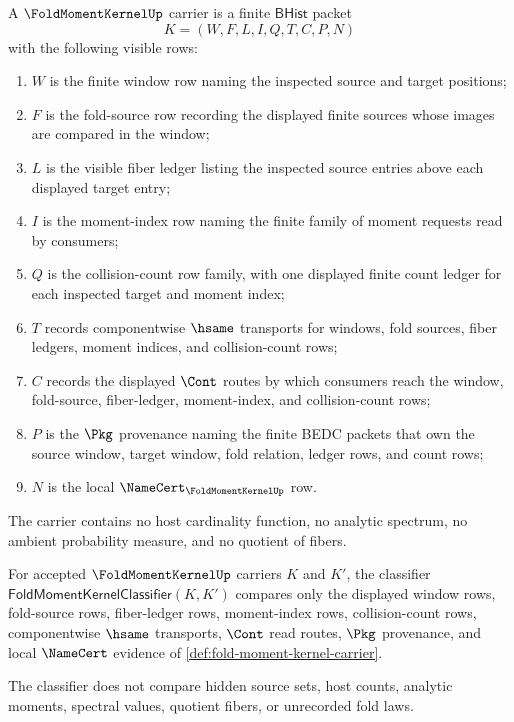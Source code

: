\begin{definition}
\label{def:fold-moment-kernel-carrier}
A $\FoldMomentKernelUp$ carrier is a finite $\mathsf{BHist}$ packet
$$
K=(W,F,L,I,Q,T,C,P,N)
$$
with the following visible rows:
\begin{enumerate}
\item $W$ is the finite window row naming the inspected source and target
positions;
\item $F$ is the fold-source row recording the displayed finite sources whose
images are compared in the window;
\item $L$ is the visible fiber ledger listing the inspected source entries
above each displayed target entry;
\item $I$ is the moment-index row naming the finite family of moment requests
read by consumers;
\item $Q$ is the collision-count row family, with one displayed finite count
ledger for each inspected target and moment index;
\item $T$ records componentwise $\hsame$ transports for windows, fold sources,
fiber ledgers, moment indices, and collision-count rows;
\item $C$ records the displayed $\Cont$ routes by which consumers reach the
window, fold-source, fiber-ledger, moment-index, and collision-count rows;
\item $P$ is the $\Pkg$ provenance naming the finite BEDC packets that own the
source window, target window, fold relation, ledger rows, and count rows;
\item $N$ is the local $\NameCert_{\FoldMomentKernelUp}$ row.
\end{enumerate}
The carrier contains no host cardinality function, no analytic spectrum, no
ambient probability measure, and no quotient of fibers.
\end{definition}

\begin{definition}
\label{def:fold-moment-kernel-classifier}
For accepted $\FoldMomentKernelUp$ carriers $K$ and $K'$, the classifier
$\mathsf{FoldMomentKernelClassifier}(K,K')$ compares only the displayed window
rows, fold-source rows, fiber-ledger rows, moment-index rows, collision-count
rows, componentwise $\hsame$ transports, $\Cont$ read routes, $\Pkg$
provenance, and local $\NameCert$ evidence of
\autoref{def:fold-moment-kernel-carrier}.

The classifier does not compare hidden source sets, host counts, analytic
moments, spectral values, quotient fibers, or unrecorded fold laws.
\end{definition}

